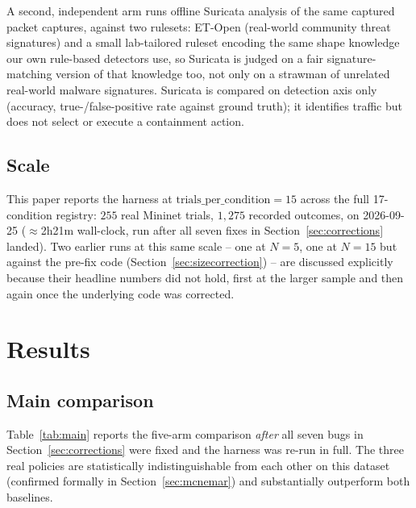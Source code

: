 \documentclass[conference]{IEEEtran}
\begin{document}
A second, independent arm runs offline Suricata analysis of the same captured packet captures,
against two rulesets: ET-Open (real-world community threat signatures) and a small lab-tailored
ruleset encoding the same shape knowledge our own rule-based detectors use, so Suricata is judged
on a fair signature-matching version of that knowledge too, not only on a strawman of unrelated
real-world malware signatures. Suricata is compared on detection axis only (accuracy,
true-/false-positive rate against ground truth); it identifies traffic but does not select or
execute a containment action.

\subsection{Scale}

This paper reports the harness at $\text{trials\_per\_condition}=15$ across the full 17-condition
registry: $255$ real Mininet trials, $1{,}275$ recorded outcomes, on 2026-09-25 ($\approx$2h21m
wall-clock, run after all seven fixes in Section~\ref{sec:corrections} landed). Two earlier runs at
this same scale -- one at $N=5$, one at $N=15$ but against the pre-fix code
(Section~\ref{sec:sizecorrection}) -- are discussed explicitly because their headline numbers did
not hold, first at the larger sample and then again once the underlying code was corrected.

\section{Results}

\subsection{Main comparison}

Table~\ref{tab:main} reports the five-arm comparison \emph{after} all seven bugs in
Section~\ref{sec:corrections} were fixed and the harness was re-run in full. The three real
policies are statistically indistinguishable from each other on this dataset (confirmed formally
in Section~\ref{sec:mcnemar}) and substantially outperform both baselines.
\end{document}
